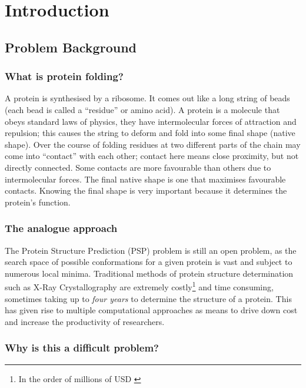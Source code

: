 
\chapter{Introduction}

\section{Problem Background}

\subsection{What is protein folding?}

A protein is synthesised by a ribosome. It comes out like a long string of beads (each bead is called a “residue” or amino acid). A protein is a molecule that obeys standard laws of physics, they have intermolecular forces of attraction and repulsion; this causes the string to deform and fold into some final shape (native shape). Over the course of folding residues at two different parts of the chain may come into “contact” with each other; contact here means close proximity, but not directly connected. Some contacts are more favourable than others due to intermolecular forces. The final native shape is one that maximises favourable contacts. Knowing the final shape is very important because it determines the protein’s function.

\subsection{The analogue approach}

The Protein Structure Prediction (PSP) problem is still an open problem, as the search space of possible conformations
   for a given protein is vast and subject to numerous local minima. Traditional
   methods of protein structure determination such as X-Ray Crystallography \cite{lesk}
   are extremely costly\footnote{In the order of millions of USD \cite{alberts}} and time
   consuming, sometimes taking up to \emph{four years} to determine the structure of a protein.
   This has given rise to multiple computational approaches \cite{Cymerman2008} as means
   to drive down cost and increase the productivity of researchers. 

   \subsection{Why is this a difficult problem?}

